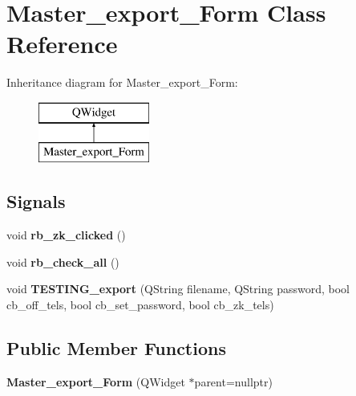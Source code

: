 \hypertarget{class_master__export___form}{}\section{Master\+\_\+export\+\_\+\+Form Class Reference}
\label{class_master__export___form}
Inheritance diagram for Master\+\_\+export\+\_\+\+Form\+:\begin{figure}[H]
\begin{center}
\leavevmode
\includegraphics[height=2.000000cm]{class_master__export___form}
\end{center}
\end{figure}
\subsection*{Signals}
\begin{DoxyCompactItemize}
\item 
\mbox{\label{class_master__export___form_aab7d2eb7a9519a0f0c7b880ae3d3ab9f}} 
void {\bfseries rb\+\_\+zk\+\_\+clicked} ()
\item 
\mbox{\label{class_master__export___form_a0d95c7c85794a862e6951cb064d5c34c}} 
void {\bfseries rb\+\_\+check\+\_\+all} ()
\item 
\mbox{\label{class_master__export___form_ad89858273cd98e9375402f9c0f5ff5f9}} 
void {\bfseries T\+E\+S\+T\+I\+N\+G\+\_\+export} (Q\+String filename, Q\+String password, bool cb\+\_\+off\+\_\+tels, bool cb\+\_\+set\+\_\+password, bool cb\+\_\+zk\+\_\+tels)
\end{DoxyCompactItemize}
\subsection*{Public Member Functions}
\begin{DoxyCompactItemize}
\item 
\mbox{\label{class_master__export___form_a553e1bf029068d6773897efff3988d7a}} 
{\bfseries Master\+\_\+export\+\_\+\+Form} (Q\+Widget $\ast$parent=nullptr)
\end{DoxyCompactItemize}
